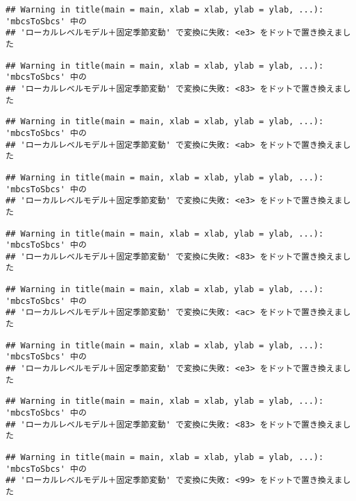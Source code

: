 \documentclass[]{article}
\begin{document}
\begin{verbatim}
## Warning in title(main = main, xlab = xlab, ylab = ylab, ...): 'mbcsToSbcs' 中の
## 'ローカルレベルモデル＋固定季節変動' で変換に失敗: <e3> をドットで置き換えました
\end{verbatim}

\begin{verbatim}
## Warning in title(main = main, xlab = xlab, ylab = ylab, ...): 'mbcsToSbcs' 中の
## 'ローカルレベルモデル＋固定季節変動' で変換に失敗: <83> をドットで置き換えました
\end{verbatim}

\begin{verbatim}
## Warning in title(main = main, xlab = xlab, ylab = ylab, ...): 'mbcsToSbcs' 中の
## 'ローカルレベルモデル＋固定季節変動' で変換に失敗: <ab> をドットで置き換えました
\end{verbatim}

\begin{verbatim}
## Warning in title(main = main, xlab = xlab, ylab = ylab, ...): 'mbcsToSbcs' 中の
## 'ローカルレベルモデル＋固定季節変動' で変換に失敗: <e3> をドットで置き換えました
\end{verbatim}

\begin{verbatim}
## Warning in title(main = main, xlab = xlab, ylab = ylab, ...): 'mbcsToSbcs' 中の
## 'ローカルレベルモデル＋固定季節変動' で変換に失敗: <83> をドットで置き換えました
\end{verbatim}

\begin{verbatim}
## Warning in title(main = main, xlab = xlab, ylab = ylab, ...): 'mbcsToSbcs' 中の
## 'ローカルレベルモデル＋固定季節変動' で変換に失敗: <ac> をドットで置き換えました
\end{verbatim}

\begin{verbatim}
## Warning in title(main = main, xlab = xlab, ylab = ylab, ...): 'mbcsToSbcs' 中の
## 'ローカルレベルモデル＋固定季節変動' で変換に失敗: <e3> をドットで置き換えました
\end{verbatim}

\begin{verbatim}
## Warning in title(main = main, xlab = xlab, ylab = ylab, ...): 'mbcsToSbcs' 中の
## 'ローカルレベルモデル＋固定季節変動' で変換に失敗: <83> をドットで置き換えました
\end{verbatim}

\begin{verbatim}
## Warning in title(main = main, xlab = xlab, ylab = ylab, ...): 'mbcsToSbcs' 中の
## 'ローカルレベルモデル＋固定季節変動' で変換に失敗: <99> をドットで置き換えました
\end{verbatim}
\end{document}
